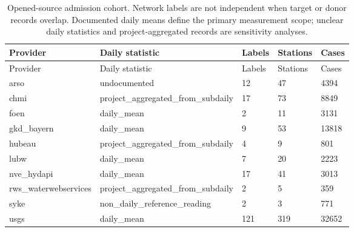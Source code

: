 {\tabletext
\setlength{\tabcolsep}{3pt}
\begin{longtable}{p{}p{}p{}p{}p{}}
\caption{Opened-source admission cohort. Network labels are not independent when target or donor records overlap. Documented daily means define the primary measurement scope; unclear daily statistics and project-aggregated records are sensitivity analyses.}\label{tab:r3si-providers}\\
\toprule
Provider & Daily statistic & Labels & Stations & Cases \\
\midrule
\endfirsthead
\toprule
Provider & Daily statistic & Labels & Stations & Cases \\
\midrule
\endhead
arso & undocumented & 12 & 47 & 4394 \\
chmi & project\_\allowbreak aggregated\_\allowbreak from\_\allowbreak subdaily & 17 & 73 & 8849 \\
foen & daily\_\allowbreak mean & 2 & 11 & 3131 \\
gkd\_\allowbreak bayern & daily\_\allowbreak mean & 9 & 53 & 13818 \\
hubeau & project\_\allowbreak aggregated\_\allowbreak from\_\allowbreak subdaily & 4 & 9 & 801 \\
lubw & daily\_\allowbreak mean & 7 & 20 & 2223 \\
nve\_\allowbreak hydapi & daily\_\allowbreak mean & 17 & 41 & 3013 \\
rws\_\allowbreak waterwebservices & project\_\allowbreak aggregated\_\allowbreak from\_\allowbreak subdaily & 2 & 5 & 359 \\
syke & non\_\allowbreak daily\_\allowbreak reference\_\allowbreak reading & 2 & 3 & 771 \\
usgs & daily\_\allowbreak mean & 121 & 319 & 32652 \\
\bottomrule
\end{longtable}
}

